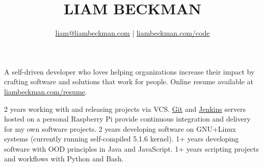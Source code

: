 


\title{\textcolor{my-red}{LIAM BECKMAN}}
\author{
    \textcolor{my-blue}{\href{mailto:liam@liambeckman.com}{liam@liambeckman.com}} | \textcolor{my-blue}{\href{https://liambeckman.com/code}{liambeckman.com/code}}
}

\date{\vspace{-5ex}}



\maketitle

\begin{center}
    A self-driven developer who loves helping organizations increase their impact by crafting software and solutions that work for people.
    Online resume available at \textcolor{my-blue}{\href{https://liambeckman.com/resume}{liambeckman.com/resume}}.
\end{center}





\vspace{-1em}
\begin{itemize}[label=$\triangleright$]
    2 years working with and releasing projects via VCS. \textcolor{my-blue}{\href{https://git.liambeckman.com/}{Git}} and \textcolor{my-blue}{\href{https://liambeckman.com/jenkins/blue/organizations/jenkins/pipelines/}{Jenkins}} servers hosted on a personal Raspberry Pi provide continuous integration and delivery for my own software projects.
    2 years developing software on GNU+Linux systems (currently running self-compiled 5.1.6 kernel).
    1+ years developing software with OOD principles in Java and JavaScript.
    1+ years scripting projects and workflows with Python and Bash.
\end{itemize}

\medbreak








\vfill


\pagebreak





